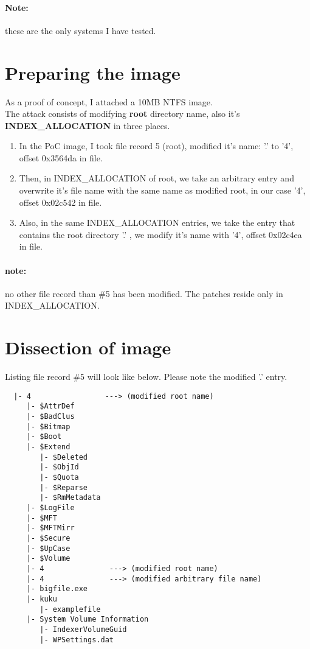 \documentclass[12pt]{article}
\begin{document}
\paragraph{Note:}
these are the only systems I have tested.

\section{Preparing the image}\label{prepare_image}
As a proof of concept, I attached a 10MB NTFS image. \\
The attack consists of modifying \textbf{root} directory name, also it's \textbf{INDEX\_ALLOCATION} in three places.

\begin{enumerate}

\item In the PoC image, I took file record 5 (root), modified it's name: '.' to '4', offset 0x3564da in file.

\item Then, in INDEX\_ALLOCATION of root, we take an arbitrary entry and overwrite it's file name with the same name as modified root, in our case '4', offset 0x02c542 in file.

\item Also, in the same INDEX\_ALLOCATION entries, we take the entry that contains the root directory '.' , we modify it's name with '4', offset 0x02c4ea in file. 

\end{enumerate}
\paragraph{note:}
 no other file record than \#5 has been modified. The patches reside only in INDEX\_ALLOCATION.

\section{Dissection of image}
Listing file record \#5 will look like below. Please note the modified '.' entry.
\begin{verbatim}
  |- 4                 ---> (modified root name)
     |- $AttrDef
     |- $BadClus
     |- $Bitmap
     |- $Boot
     |- $Extend
        |- $Deleted
        |- $ObjId
        |- $Quota
        |- $Reparse
        |- $RmMetadata
     |- $LogFile
     |- $MFT
     |- $MFTMirr
     |- $Secure
     |- $UpCase
     |- $Volume
     |- 4               ---> (modified root name)
     |- 4               ---> (modified arbitrary file name)
     |- bigfile.exe
     |- kuku
        |- examplefile
     |- System Volume Information
        |- IndexerVolumeGuid
        |- WPSettings.dat

\end{verbatim}
\end{document}
